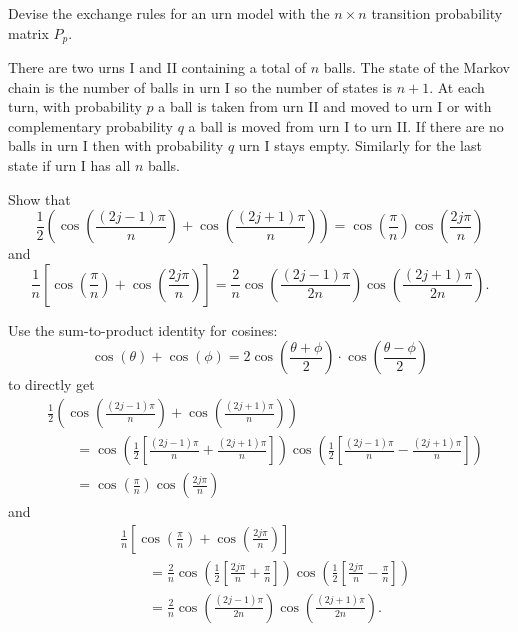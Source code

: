 \documentclass[12pt]{article}
\begin{document}
\begin{exercise}
    Devise the exchange rules for an urn model with the \( n \times n \)
    transition probability matrix \( P_{p} \).
\end{exercise}
\begin{solution}
    There are two urns I and II containing a total of \( n \) balls. The
    state of the Markov chain is the number of balls in urn I so the
    number of states is \( n+1 \).  At each turn, with probability \( p \)
    a ball is taken from urn II and moved to urn I or with complementary
    probability \( q \) a ball is moved from urn I to urn II\@.  If
    there are no balls in urn I then with probability \( q \) urn I
    stays empty.  Similarly for the last state if urn I has all \( n \)
    balls.
\end{solution}
\begin{exercise}
    Show that
    \[
        \frac{1}{2} \left( \cos\left( \frac{(2j-1)\pi }{n } \right) +
        \cos\left( \frac{(2j+1)\pi }{n } \right) \right) = \cos\left(
        \frac{\pi}{n} \right) \cos\left( \frac{2 j \pi}{n} \right)
    \] and
    \[
        \frac{1}{n} \left[ \cos\left( \frac{\pi}{n} \right) + \cos\left(
        \frac{2j\pi}{n} \right) \right] = \frac{2}{n} \cos\left( \frac{(2j
        - 1) \pi }{2n} \right) \cos\left( \frac{(2j+1) \pi }{2n} \right).
    \]
\end{exercise}
\begin{solution}
    Use the sum-to-product identity for cosines:
    \[
        \cos( \theta) + \cos(\phi) = 2 \cos \left( \frac{\theta + \phi}{2}
        \right) \cdot \cos \left( \frac{\theta - \phi}{2} \right)
    \] to directly get
    \begin{align*}
        &\frac{1}{2} \left( \cos\left( \frac{(2j-1)\pi }{n } \right) +
        \cos\left( \frac{(2j+1)\pi }{n } \right) \right) \\
        &\qquad = \cos\left( \frac{1}{2} \left[ \frac{(2j-1)\pi}{n} +
        \frac{(2j+1)\pi}{n}\right] \right) \cos\left( \frac{1}{2} \left[
        \frac{(2j-1)\pi}{n} - \frac{(2j+1)\pi}{n}\right]\right)\\
        &\qquad = \cos\left( \frac{\pi}{n} \right) \cos\left( \frac{2 j
        \pi}{n} \right)
    \end{align*}
    and
    \begin{align*}
        &\frac{1}{n} \left[ \cos\left( \frac{\pi}{n} \right) + \cos\left
        ( \frac{2j\pi}{n} \right) \right] \\
        &\qquad = \frac{2}{n} \cos\left( \frac{1}{2} \left[ \frac{2j\pi}
        {n} + \frac{\pi}{n}\right] \right) \cos\left( \frac{1}{2} \left[
        \frac{2j\pi}{n} - \frac{\pi}{n}\right]\right) \\
        &\qquad = \frac{2}{n} \cos\left( \frac{(2j - 1) \pi }{2n} \right)
        \cos\left( \frac{(2j+1) \pi }{2n} \right).
    \end{align*}
\end{solution}
\end{document}
